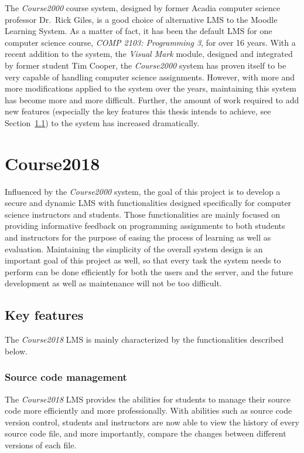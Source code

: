 \medskip

The \emph{Course2000} course system, designed by former Acadia computer science
professor Dr.~Rick Giles, is a good choice
of alternative LMS to the Moodle Learning System.
As a matter of fact, it has been the
default LMS for one computer science course, \emph{COMP 2103: Programming 3},
for over 16 years.
With a recent addition to the system,
the \emph{Visual Mark} module,
designed and integrated by former student Tim Cooper,
the \emph{Course2000} system has proven itself
to be very capable of handling computer science assignments.
However, with more
and more modifications applied to the system over the years, maintaining
this system has become more and more difficult.
Further, the amount of work required to add new features (especially the key
features this thesis intends to achieve, see Section~\ref{FEATURES}) to the system
has increased dramatically.

\section{Course2018}
Influenced by the \emph{Course2000} system, the goal of this project is to
develop a secure and dynamic LMS with functionalities designed specifically for
computer science instructors and students.
Those functionalities are mainly focused on
providing informative feedback on programming assignments to both students
and instructors for the purpose of easing the process of learning as well as
evaluation.
Maintaining the simplicity of the overall system design 
is an important goal of this project as well,
so that every task the system needs to
perform can be done efficiently for both the users and the server,
and the future development as well as maintenance will not be too difficult.

\subsection{Key features}
\label{FEATURES}
The \emph{Course2018} LMS is mainly characterized by the functionalities
described below.

\subsubsection{Source code management}
The \emph{Course2018} LMS provides the abilities for students to manage
their source code more efficiently and more professionally. With abilities such
as source code version control, students and instructors are now able
to view the history of every source code file, and more importantly, compare
the changes between different versions of each file.


